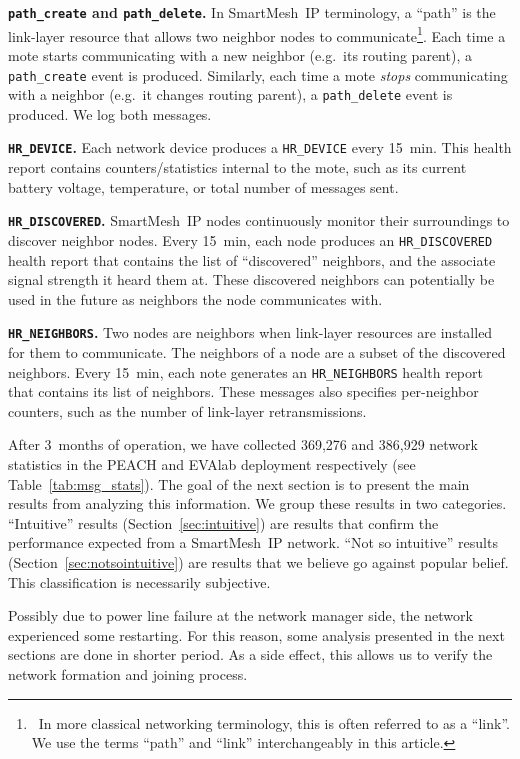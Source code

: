 \documentclass{elsarticle}
\newcommand{\smip}                {SmartMesh~IP\xspace}
\newcommand{\HRNEIGHBORS}         {{\tt HR\_NEIGHBORS}\xspace}
\newcommand{\HRDISCOVERED}        {{\tt HR\_DISCOVERED}\xspace}
\newcommand{\HRDEVICE}            {{\tt HR\_DEVICE}\xspace}
\newcommand{\pathcreate}          {{\tt path\_create}\xspace}
\newcommand{\pathdelete}          {{\tt path\_delete}\xspace}
\newcommand{\PEACHNUMSTATS}       {369,276\xspace}
\newcommand{\EVANUMSTATS}         {386,929\xspace}
\begin{document}
\textbf{\pathcreate and \pathdelete.}
In \smip terminology, a ``path'' is the link-layer resource that allows two neighbor nodes to communicate\footnote{~In more classical networking terminology, this is often referred to as a ``link''. We use the terms ``path'' and ``link'' interchangeably in this article.}.
Each time a mote starts communicating with a new neighbor (e.g.~its routing parent), a \pathcreate event is produced.
Similarly, each time a mote \textit{stops} communicating with a neighbor (e.g.~it changes routing parent), a \pathdelete event is produced.
We log both messages.

\textbf{\HRDEVICE.}
Each network device produces a \HRDEVICE every 15~min.
This health report contains counters/statistics internal to the mote, such as its current battery voltage, temperature, or total number of messages sent.

\textbf{\HRDISCOVERED.}
\smip nodes continuously monitor their surroundings to discover neighbor nodes.
Every 15~min, each node produces an \HRDISCOVERED health report that contains the list of ``discovered'' neighbors, and the associate signal strength it heard them at.
These discovered neighbors can potentially be used in the future as neighbors the node communicates with.

\textbf{\HRNEIGHBORS.}
Two nodes are neighbors when link-layer resources are installed for them to communicate.
The neighbors of a node are a subset of the discovered neighbors.
Every 15~min, each note generates an \HRNEIGHBORS health report that contains its list of neighbors.
These messages also specifies per-neighbor counters, such as the number of link-layer retransmissions.


After 3~months of operation, we have collected \PEACHNUMSTATS and \EVANUMSTATS network statistics in the PEACH and EVAlab deployment respectively (see Table~\ref{tab:msg_stats}).
The goal of the next section is to present the main results from analyzing this information.
We group these results in two categories.
``Intuitive'' results (Section~\ref{sec:intuitive}) are results that confirm the performance expected from a \smip network.
``Not so intuitive'' results (Section~\ref{sec:notsointuitive}) are results that we believe go against popular belief.
This classification is necessarily subjective.

Possibly due to power line failure at the network manager side, the network experienced some restarting.
For this reason, some analysis presented in the next sections are done in shorter period.
As a side effect, this allows us to verify the network formation and joining process.
\end{document}
